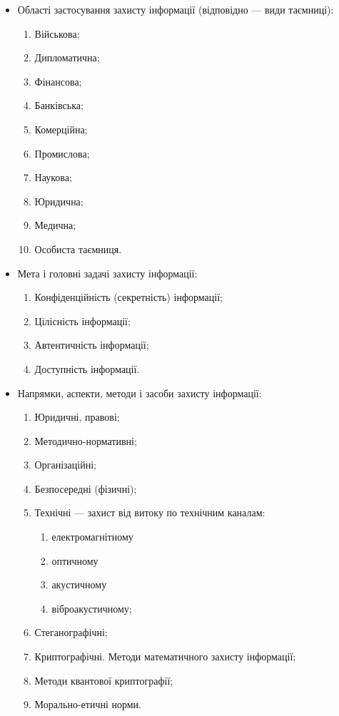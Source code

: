 \begin{itemize}
    \item{Області застосування захисту інформації
        (відповідно --- види таємниці):}
        \begin{multicols}{2}
            \begin{enumerate}
                \item Військова;
                \item Дипломатична;
                \item Фінансова;
                \item Банківська;
                \item Комерційна;
                \item Промислова;
                \item Наукова;
                \item Юридична;
                \item Медична;
                \item Особиста таємниця.
            \end{enumerate}
        \end{multicols}
    \item{Мета і головні задачі захисту інформації:}
        \begin{enumerate}
            \item Конфіденційність (секретність) інформації;
            \item Цілісність інформації;
            \item Автентичність інформації;
            \item Доступність інформації.
        \end{enumerate}
    \item{Напрямки, аспекти, методи і засоби захисту інформації:}
        \begin{enumerate}
        \item Юридичні, правові;
        \item Методично-нормативні;
        \item Організаційні;
        \item Безпосередні (фізичні);
        \item Технічні --- захист від витоку  по технічним каналам:
            \begin{enumerate}
                \item електромагнітному
                \item оптичному
                \item акустичному
                \item віброакустичному;
        \end{enumerate}
        \item Стеганографічні;
        \item Криптографічні. Методи математичного захисту інформації; 
        \item Методи квантової криптографії; 
        \item Морально-етичні норми.  
    \end{enumerate}
\end{itemize}
